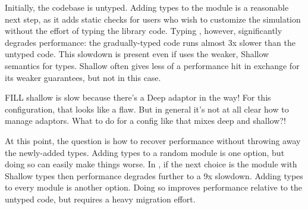 Initially, the  codebase is untyped.
Adding types to the  module is a reasonable next step,
as it adds static checks for users who wish to customize the simulation
without the effort of typing the library code.
Typing , however, significantly degrades performance:
the gradually-typed code runs almost 3x slower than the untyped code.
This slowdown is present even if  uses the weaker, Shallow
semantics for types.
Shallow often gives less of a performance hit in exchange for its weaker
guarantees, but not in this case.

{
FILL shallow is slow because there's a Deep adaptor in the way!
For this configuration, that looks like a flaw. But in general
it's not at all clear how to manage adaptors. What to do for
a config like  that mixes deep and shallow?!
}


At this point, the question is how to recover performance
without throwing away the newly-added types.
Adding types to a random module is one option, but doing so
can easily make things worse.
In , if the next choice is the  module
with Shallow types then performance degrades further to a
9x slowdown.
Adding types to every module is another option.
Doing so improves  performance relative to the untyped code,
but requires a heavy migration effort.



